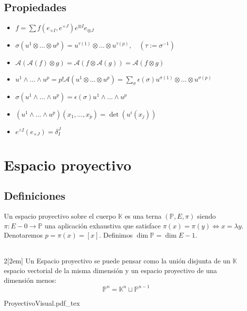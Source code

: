 \documentclass{myclass}
\newcommand{\incfig}[1]{%
  \def\svgwidth{0.9\columnwidth}
  {#1.pdf_tex}
}
\newcommand{\A}{\mathcal{A}}
\newcommand{\K}{\mathbb{K}}
\renewcommand{\P}{\mathbb{P}}
\renewcommand{\A}{\mathcal{A}}
\begin{document}
\subsection{Propiedades}
\begin{itemize}
    \item $f=\sum f(e_{\times I}, e^{\times J})e^{\otimes I}e_{\otimes J}$
    \item $\sigma (u^1\otimes \ldots \otimes u^p) = u^{\tau(1)}\otimes \ldots \otimes u^{\tau(p)}, \quad (\tau := \sigma^{-1})$
    \item $\A(\A(f)\otimes g) = \A(f\otimes\A(g)) = \A(f\otimes g)$
    \item $u^1\wedge \ldots \wedge u^p = p!\A(u^1\otimes \ldots \otimes u^p) = \sum_\sigma \epsilon(\sigma)u^{\sigma(1)}\otimes \ldots \otimes u^{\sigma(p)}$
    \item $\sigma(u^1\wedge \ldots \wedge u^p) = \epsilon(\sigma)u^1\wedge \ldots \wedge u^p$
    \item $(u^1\wedge \ldots \wedge u^p)(x_1, \ldots, x_p) = \det (u^i(x_j))$
    \item $e^{\wedge I}(e_{\times J}) = \delta_I^J$
\end{itemize}




\section{Espacio proyectivo}
\subsection{Definiciones}
Un espacio proyectivo sobre el cuerpo $\K$ es una terna $(\P, E, \pi)$ siendo $\pi:E-{0}\to \P$ una aplicación exhaustiva que satisface $\pi(x)=\pi(y)\iff x=\lambda y$.\\
Denotaremos $p = \pi(x) = [x]$. Definimos $\dim\P = \dim E -1$. \\
\\

\begin{multicols}{2}[\columnsep2em] 
Un Espacio proyectivo se puede pensar como la unión disjunta de un $\K$ espacio vectorial de la misma dimensión y un espacio proyectivo de una dimensión menos:
$$
\P^n = \K^n \sqcup \P^{n-1}
$$
\columnbreak


    \incfig{ProyectivoVisual}

\end{multicols}
\end{document}

